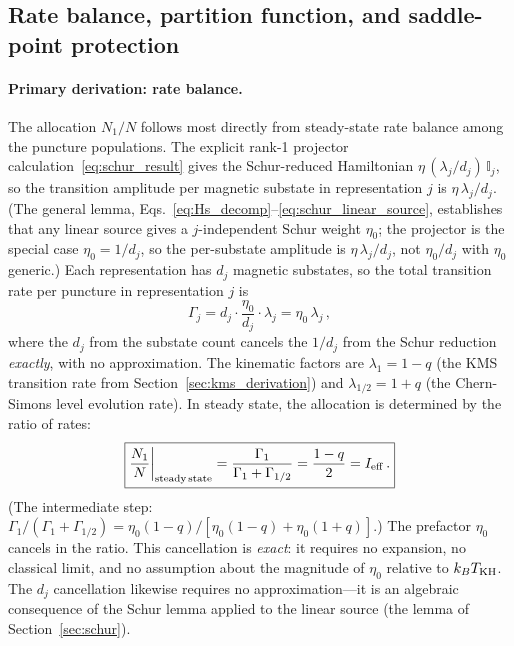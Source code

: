 \documentclass[aps,prd,twocolumn,10pt,superscriptaddress,nofootinbib]{revtex4-2}
\begin{document}
\subsection{Rate balance, partition function, and saddle-point
protection}
\label{sec:partition}

\paragraph{Primary derivation: rate balance.}

The allocation $N_1/N$ follows most directly from steady-state
rate balance among the puncture populations.  The explicit rank-1 projector
calculation~\eqref{eq:schur_result} gives the Schur-reduced
Hamiltonian $\eta\,(\lambda_j/d_j)\,\mathbb{I}_j$, so the
transition amplitude per magnetic substate in representation $j$
is $\eta\,\lambda_j/d_j$.  (The general lemma,
Eqs.~\eqref{eq:Hs_decomp}--\eqref{eq:schur_linear_source},
establishes that any linear source gives a $j$-independent
Schur weight $\eta_0$; the projector is the special case
$\eta_0 = 1/d_j$, so the per-substate amplitude is
$\eta\,\lambda_j/d_j$, not $\eta_0/d_j$ with $\eta_0$ generic.)
Each representation has $d_j$ magnetic substates, so the total
transition rate per puncture in representation $j$ is
\begin{equation}
\Gamma_j
  = d_j \cdot \frac{\eta_0}{d_j} \cdot \lambda_j
  = \eta_0\,\lambda_j\,,
\label{eq:rate_per_rep}
\end{equation}
where the $d_j$ from the substate count cancels the $1/d_j$ from
the Schur reduction \emph{exactly}, with no approximation.
The kinematic factors are $\lambda_1 = 1-q$ (the KMS transition
rate from Section~\ref{sec:kms_derivation}) and
$\lambda_{1/2} = 1+q$ (the Chern-Simons level evolution rate).
In steady state, the allocation is determined by the ratio of
rates:
\begin{equation}
\boxed{\frac{N_1}{N}\bigg|_{\rm steady\,state}
  = \frac{\Gamma_1}{\Gamma_1 + \Gamma_{1/2}}
  = \frac{1-q}{2}
  = I_{\rm eff}\,.}
\label{eq:saddle}
\end{equation}
(The intermediate step:
$\Gamma_1/(\Gamma_1 + \Gamma_{1/2})
= \eta_0(1{-}q)/[\eta_0(1{-}q) + \eta_0(1{+}q)]$.)
The prefactor $\eta_0$ cancels in the ratio.  This cancellation is
\emph{exact}: it requires no expansion, no classical limit, and no
assumption about the magnitude of $\eta_0$ relative to $k_B T_{\rm KH}$.
The $d_j$ cancellation likewise requires no approximation---it is
an algebraic consequence of the Schur lemma applied to the
linear source (the lemma of
Section~\ref{sec:schur}).
\end{document}
